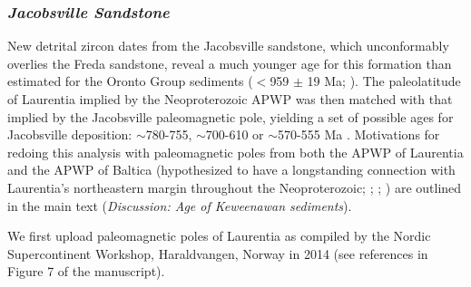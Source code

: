 \documentclass{article}
\begin{document}
    \subsubsection{\texorpdfstring{\textit{Jacobsville
Sandstone}}{Jacobsville Sandstone}}\label{jacobsville-sandstone}

    New detrital zircon dates from the Jacobsville sandstone, which
unconformably overlies the Freda sandstone, reveal a much younger age
for this formation than estimated for the Oronto Group sediments
($<$959 \(\pm\) 19 Ma; \citealp{Malone2016a}). The
paleolatitude of Laurentia implied by the Neoproterozoic APWP was then
matched with that implied by the Jacobsville paleomagnetic pole,
yielding a set of possible ages for Jacobsville deposition:
$\sim$780-755, $\sim$700-610 or $\sim$570-555 Ma \citep{Malone2016a}. Motivations for
redoing this analysis with paleomagnetic poles from both the APWP of
Laurentia and the APWP of Baltica (hypothesized to have a longstanding
connection with Laurentia's northeastern margin throughout the
Neoproterozoic; \citealp{Pisarevsky2003a}; \citealp{Li2008a}; \citealp{Evans2009a})
are outlined in the main text (\textit{Discussion: Age of Keweenawan
sediments}).

We first upload paleomagnetic poles of Laurentia as compiled by the
Nordic Supercontinent Workshop, Haraldvangen, Norway in 2014 (see
references in Figure 7 of the manuscript).
\end{document}

